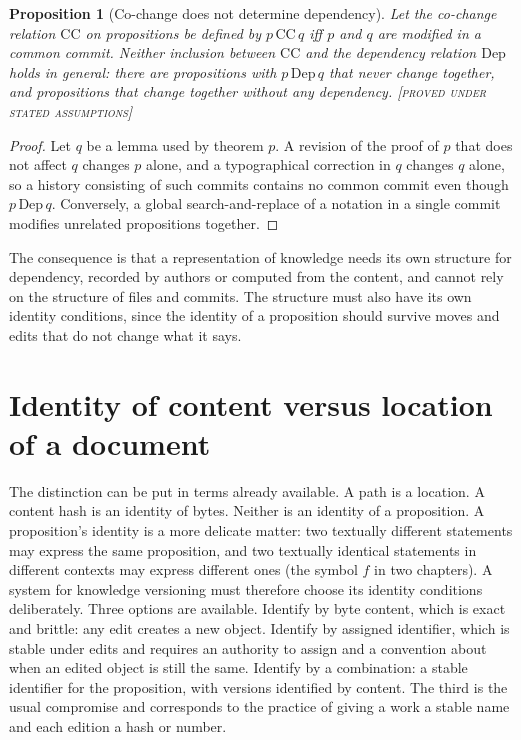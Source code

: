 \documentclass[11pt,twoside,openright]{book}
\theoremstyle{plain}
\newtheorem{proposition}[theorem]{Proposition}
\theoremstyle{definition}
\theoremstyle{remark}
\newcommand{\Proved}{\textup{\textsc{[proved under stated assumptions]}}}
\begin{document}
\begin{proposition}[Co-change does not determine dependency]\label{prop:cochange}
Let the co-change relation $\mathrm{CC}$ on propositions be defined by $p\,\mathrm{CC}\,q$ iff $p$ and $q$ are modified in a common commit. Neither inclusion between $\mathrm{CC}$ and the dependency relation $\mathrm{Dep}$ holds in general: there are propositions with $p\,\mathrm{Dep}\,q$ that never change together, and propositions that change together without any dependency.
\Proved{}
\end{proposition}

\begin{proof}
Let $q$ be a lemma used by theorem $p$. A revision of the proof of $p$ that does not affect $q$ changes $p$ alone, and a typographical correction in $q$ changes $q$ alone, so a history consisting of such commits contains no common commit even though $p\,\mathrm{Dep}\,q$. Conversely, a global search-and-replace of a notation in a single commit modifies unrelated propositions together.
\end{proof}

The consequence is that a representation of knowledge needs its own structure for dependency, recorded by authors or computed from the content, and cannot rely on the structure of files and commits. The structure must also have its own identity conditions, since the identity of a proposition should survive moves and edits that do not change what it says.

\section{Identity of content versus location of a document}

The distinction can be put in terms already available. A path is a location. A content hash is an identity of bytes. Neither is an identity of a proposition. A proposition's identity is a more delicate matter: two textually different statements may express the same proposition, and two textually identical statements in different contexts may express different ones (the symbol $f$ in two chapters). A system for knowledge versioning must therefore choose its identity conditions deliberately. Three options are available. Identify by byte content, which is exact and brittle: any edit creates a new object. Identify by assigned identifier, which is stable under edits and requires an authority to assign and a convention about when an edited object is still the same. Identify by a combination: a stable identifier for the proposition, with versions identified by content. The third is the usual compromise and corresponds to the practice of giving a work a stable name and each edition a hash or number.
\end{document}
